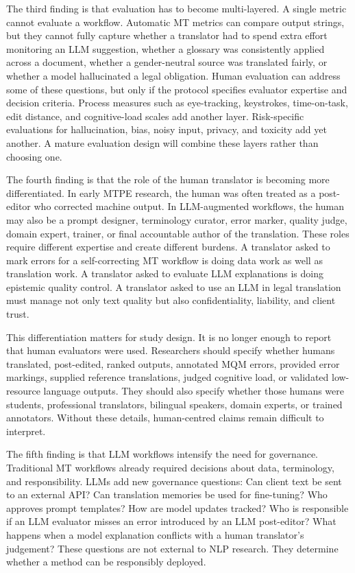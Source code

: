 \documentclass[11pt]{article}
\begin{document}
The third finding is that evaluation has to become multi-layered. A single metric cannot evaluate a workflow. Automatic MT metrics can compare output strings, but they cannot fully capture whether a translator had to spend extra effort monitoring an LLM suggestion, whether a glossary was consistently applied across a document, whether a gender-neutral source was translated fairly, or whether a model hallucinated a legal obligation. Human evaluation can address some of these questions, but only if the protocol specifies evaluator expertise and decision criteria. Process measures such as eye-tracking, keystrokes, time-on-task, edit distance, and cognitive-load scales add another layer. Risk-specific evaluations for hallucination, bias, noisy input, privacy, and toxicity add yet another. A mature evaluation design will combine these layers rather than choosing one.

The fourth finding is that the role of the human translator is becoming more differentiated. In early MTPE research, the human was often treated as a post-editor who corrected machine output. In LLM-augmented workflows, the human may also be a prompt designer, terminology curator, error marker, quality judge, domain expert, trainer, or final accountable author of the translation. These roles require different expertise and create different burdens. A translator asked to mark errors for a self-correcting MT workflow is doing data work as well as translation work. A translator asked to evaluate LLM explanations is doing epistemic quality control. A translator asked to use an LLM in legal translation must manage not only text quality but also confidentiality, liability, and client trust.

This differentiation matters for study design. It is no longer enough to report that human evaluators were used. Researchers should specify whether humans translated, post-edited, ranked outputs, annotated MQM errors, provided error markings, supplied reference translations, judged cognitive load, or validated low-resource language outputs. They should also specify whether those humans were students, professional translators, bilingual speakers, domain experts, or trained annotators. Without these details, human-centred claims remain difficult to interpret.

The fifth finding is that LLM workflows intensify the need for governance. Traditional MT workflows already required decisions about data, terminology, and responsibility. LLMs add new governance questions: Can client text be sent to an external API? Can translation memories be used for fine-tuning? Who approves prompt templates? How are model updates tracked? Who is responsible if an LLM evaluator misses an error introduced by an LLM post-editor? What happens when a model explanation conflicts with a human translator's judgement? These questions are not external to NLP research. They determine whether a method can be responsibly deployed.
\end{document}
